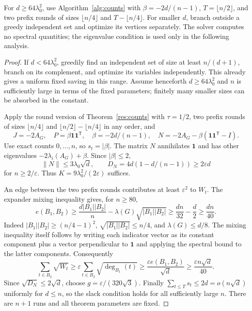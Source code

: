 \documentclass[11pt,a4paper]{article}
\theoremstyle{definition}
\theoremstyle{remark}
\newcommand{\ind}{\mathbf 1}
\begin{document}
For $d\ge64\lambda_0^2$, use Algorithm~\ref{alg:counts} with
$\beta=-2d/(n-1)$, $T=\lfloor n/2\rfloor$, and two prefix rounds
of sizes $\lfloor n/4\rfloor$ and $T-\lfloor n/4\rfloor$.
For smaller $d$, branch outside a greedy independent set and optimize
its vertices separately. The solver computes no spectral quantities;
the eigenvalue condition is used only in the following analysis.

\begin{proof}
If $d<64\lambda_0^2$, greedily find an independent set of size at least
$n/(d+1)$, branch on its complement, and optimize its variables independently.
This already gives a uniform fixed saving in this range. Assume henceforth
$d\ge64\lambda_0^2$ and $n$ is sufficiently large in terms of the fixed
parameters; finitely many smaller sizes can be absorbed in the constant.

Apply the round version of Theorem~\ref{res:counts} with $\tau=1/2$,
two prefix rounds of sizes $\lfloor n/4\rfloor$ and
$\lfloor n/2\rfloor-\lfloor n/4\rfloor$ in any order, and
\[
 J=-2A_G,\quad P=\beta\ind\ind^{\mathsf T},\quad
 \beta=-2d/(n-1),\quad N=-2A_G-\beta(\ind\ind^{\mathsf T}-I).
\]
Use exact counts $0,\ldots,n$, so $s_t=|\beta|$.
The matrix $N$ annihilates $\ind$ and has other eigenvalues
$-2\lambda_i(A_G)+\beta$. Since $|\beta|\le2$,
\[
 \|N\|\le3\lambda_0\sqrt d,\qquad
 D_N=4d(1-d/(n-1))\ge2\varepsilon d
\]
for $n\ge2/\varepsilon$. Thus $K=9\lambda_0^2/(2\varepsilon)$ suffices.

An edge between the two prefix rounds contributes at least
$\varepsilon^2$ to $W_t$. The expander mixing inequality gives, for $n\ge80$,
\[
 e(B_1,B_2)\ge \frac{d|B_1||B_2|}{n}
           -\lambda(G)\sqrt{|B_1||B_2|}
 \ge\frac{dn}{32}-\frac d2\ge\frac{dn}{40}.
\]
Indeed $|B_1||B_2|\ge(n/4-1)^2$,
$\sqrt{|B_1||B_2|}\le n/4$, and $\lambda(G)\le d/8$.
The mixing inequality itself follows by writing each indicator vector
as its constant component plus a vector perpendicular to $\ind$ and
applying the spectral bound to the latter components. Consequently
\[
 \sum_{t\in B_2}\sqrt{W_t}
 \ge\varepsilon\sum_{t\in B_2}\sqrt{\deg_{B_1}(t)}
 \ge\frac{\varepsilon e(B_1,B_2)}{\sqrt d}
 \ge\frac{\varepsilon n\sqrt d}{40}.
\]
Since $\sqrt{D_N}\le2\sqrt d$, choose $g=\varepsilon/(320\sqrt3)$.
Finally $\sum_{t\le T}s_t\le2d=o(n\sqrt d)$ uniformly for $d\le n$,
so the slack condition holds for all sufficiently large $n$.
There are $n+1$ runs and all theorem parameters are fixed.
\end{proof}
\end{document}
